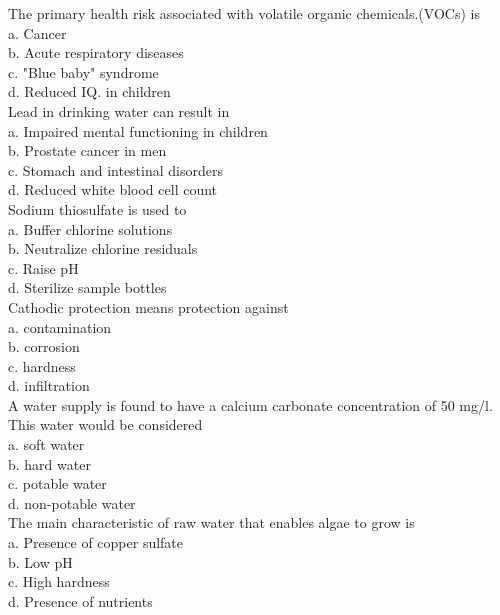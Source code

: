 The primary health risk associated with volatile organic chemicals.(VOCs) is\\
a. Cancer\\
b. Acute respiratory diseases\\
c. "Blue baby" syndrome\\
d. Reduced IQ. in children \\
Lead in drinking water can result in\\
a. Impaired mental functioning in children\\
b. Prostate cancer in men\\
c. Stomach and intestinal disorders\\
d. Reduced white blood cell count\\
Sodium thiosulfate is used to\\
a. Buffer chlorine solutions\\
b. Neutralize chlorine residuals\\
c. Raise pH\\
d. Sterilize sample bottles\\
Cathodic protection means protection against\\
a. contamination\\
b. corrosion\\
c. hardness\\
d. infiltration\\
A water supply is found to have a calcium carbonate concentration of 50 mg/l. This water would be considered\\
a. soft water\\
b. hard water\\
c. potable water\\
d. non-potable water\\
The main characteristic of raw water that enables algae to grow is\\
a. Presence of copper sulfate\\
b. Low pH\\
c. High hardness\\
d. Presence of nutrients\\











